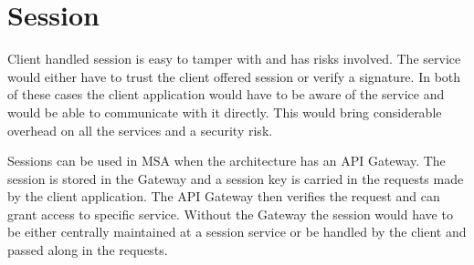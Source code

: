 

\section{Session}
\begin{sloppypar}
    Client handled session is easy to tamper with and has risks involved. The
    service would either have to trust the client offered session or verify a
    signature. In both of these cases the client application would have to be
    aware of the service and would be able to communicate with it directly. This
    would bring considerable overhead on all the services and a security risk.
\end{sloppypar}
\begin{sloppypar}
    Sessions can be used in MSA when the architecture has an API Gateway. The
    session is stored in the Gateway and a session key is carried in the
    requests made by the client application. The API Gateway then verifies the
    request and can grant access to specific service. Without the Gateway the
    session would have to be either centrally maintained at a session service or
    be handled by the client and passed along in the requests.
\end{sloppypar}
\begin{sloppypar}
\end{sloppypar}
\begin{sloppypar}
\end{sloppypar}
\begin{sloppypar}
\end{sloppypar}
\begin{sloppypar}
\end{sloppypar}
\begin{sloppypar}
\end{sloppypar}
\begin{sloppypar}
\end{sloppypar}
\begin{sloppypar}
\end{sloppypar}
\begin{sloppypar}
\end{sloppypar}
\begin{sloppypar}
\end{sloppypar}
\begin{sloppypar}
\end{sloppypar}
\begin{sloppypar}
\end{sloppypar}
\begin{sloppypar}
\end{sloppypar}
\begin{sloppypar}
\end{sloppypar}
\begin{sloppypar}
\end{sloppypar}
\begin{sloppypar}

\end{sloppypar}


